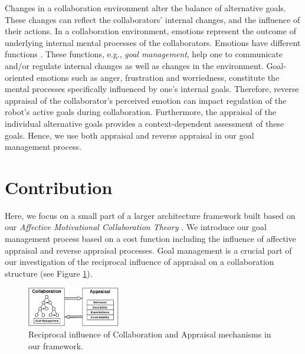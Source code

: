 \documentclass[conference]{IEEEtran}
\begin{document}

Changes in a collaboration environment alter the balance of alternative goals.
These changes can reflect the collaborators' internal changes, and the influence
of their actions. In a collaboration environment, emotions represent the outcome
of underlying internal mental processes of the collaborators. Emotions have
different functions \cite{scheutz:architectural-action-selection}. These
functions, e.g., \textit{goal management}, help one to communicate and/or
regulate internal changes as well as changes in the environment. Goal-oriented
emotions such as anger, frustration and worriedness, constitute the mental
processes specifically influenced by one's internal goals. Therefore, reverse
appraisal \cite{gratch:reverse-appraisal} of the collaborator's perceived
emotion can impact regulation of the robot's active goals during collaboration.
Furthermore, the appraisal of the individual alternative goals provides a
context-dependent assessment of these goals. Hence, we use both appraisal and
reverse appraisal in our goal management process.


\vspace*{-2mm}
\section{Contribution}

Here, we focus on a small part of a larger architecture framework built based on
our \textit{Affective Motivational Collaboration Theory}
\cite{shayganfar:amct-symbiotic}. We introduce our goal management process based
on a cost function including the influence of affective appraisal and reverse
appraisal processes. Goal management is a crucial part of our investigation of
the reciprocal influence of appraisal on a collaboration structure (see Figure
\ref{fig:actionSelection}).

\begin{figure}[tbh]
  \centering
  \includegraphics[width=0.36\textwidth]{figure/ActionSelection-croped.pdf}
  \vspace*{-2mm}
  \caption{{\fontsize{9}{9}\selectfont Reciprocal influence of Collaboration
  and Appraisal mechanisms in our framework.}}
  \label{fig:actionSelection}
  \vspace*{-7mm}
\end{figure}
\end{document}
